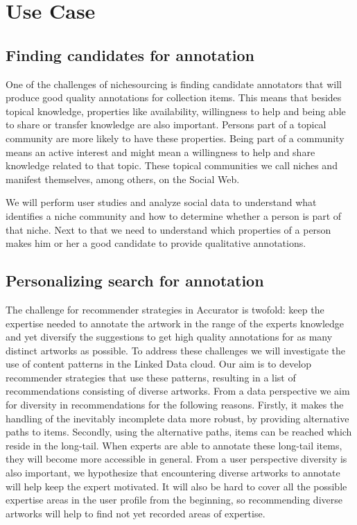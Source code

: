 \section{Use Case}\label{use_case}

\subsection{Finding candidates for annotation}
\label{finding_candidates}
One of the challenges of nichesourcing is finding candidate annotators that will produce good quality annotations for collection items. This means that besides topical knowledge, properties like availability, willingness to help and being able to share or transfer knowledge are also important. Persons part of a topical community are more likely to have these properties. Being part of a community means an active interest and might mean a willingness to help and share knowledge related to that topic. These topical communities we call niches and manifest themselves, among others, on the Social Web. 

We will perform user studies and analyze social data to understand what identifies a niche community and how to determine whether a person is part of that niche. Next to that we need to understand which properties of a person makes him or her a good candidate to provide qualitative annotations. 

\subsection{Personalizing search for annotation}
\label{personalizing_search}
The challenge for recommender strategies in Accurator is twofold: keep the expertise needed to annotate the artwork in the range of the experts knowledge and yet diversify the suggestions to get high quality annotations for as many distinct artworks as possible. To address these challenges we will investigate the use of content patterns in the Linked Data cloud. Our aim is to develop recommender strategies that use these patterns, resulting in a list of recommendations consisting of diverse artworks.
From a data perspective we aim for diversity in recommendations for the following reasons. Firstly, it makes the handling of the inevitably incomplete data more robust, by providing alternative paths to items. Secondly, using the alternative paths, items can be reached which reside in the long-tail. When experts are able to annotate these long-tail items, they will become more accessible in general.
From a user perspective diversity is also important, we hypothesize that encountering diverse artworks to annotate will help keep the expert motivated. It will also be hard to cover all the possible expertise areas in the user profile from the beginning, so recommending diverse artworks will help to find not yet recorded areas of expertise.

